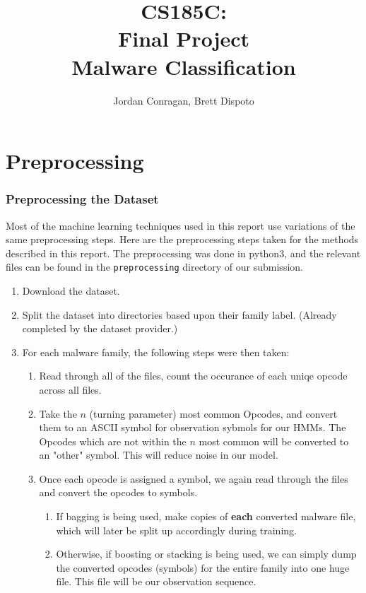 \documentclass[12pt]{article}
\title{CS185C: \\ 
Final Project \\
Malware Classification}
\author{Jordan Conragan,  Brett Dispoto}
\begin{document}
\maketitle
\tableofcontents
\newpage

\part{Preprocessing}
\section{Preprocessing the Dataset}
Most of the machine learning techniques used in this report use variations of the same preprocessing steps. Here are the preprocessing steps taken for the methods described in this report. The preprocessing was done in python3, and the relevant files can be found in the \texttt{preprocessing} directory of our submission.
  \begin{enumerate}
    \item Download the dataset.
    \item Split the dataset into directories based upon their family label. (Already completed by the dataset provider.)
    \item For each malware family, the following steps were then taken:
      \begin{enumerate}
        \item Read through all of the files, count the occurance of each uniqe opcode across all files.
        \item Take the $n$ (turning parameter) most common Opcodes, and convert them to an ASCII symbol for observation sybmols for our HMMs. The Opcodes which are not within the $n$ most common will be converted to an "other" symbol. This will reduce noise in our model.
        \item Once each opcode is assigned a symbol, we again read through the files and convert the opcodes to symbols.

        \begin{enumerate}
          \item If bagging is being used, make copies of \textbf{each} converted malware file, which will later be split up accordingly during training.
          \item Otherwise, if boosting or stacking is being used, we can simply dump the converted opcodes (symbols) for the entire family into one huge file. This file will be our observation sequence.
        \end{enumerate}
      \end{enumerate}
  \end{enumerate}
\end{document}
